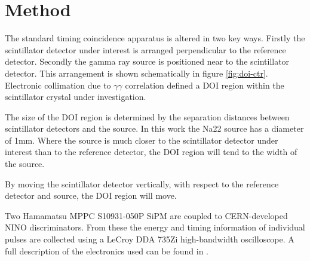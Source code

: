 \section{Method}
The standard timing coincidence apparatus is altered in two key ways. Firstly the scintillator detector under interest is arranged perpendicular to the reference detector. Secondly the gamma ray source is positioned near to the scintillator detector. This arrangement is shown schematically in figure \ref{fig:doi-ctr}. Electronic collimation due to $\gamma\gamma$ correlation defined a DOI region within the scintillator crystal under investigation. 

The size of the DOI region is determined by the separation distances between scintillator detectors and the source. In this work the Na22 source has a diameter of 1mm. Where the source is much closer to the scintillator detector under interest than to the reference detector, the DOI region will tend to the width of the source.

By moving the scintillator detector vertically, with respect to the reference detector and source, the DOI region will move.


Two Hamamatsu MPPC S10931-050P SiPM are coupled to CERN-developed NINO discriminators. From these the energy and timing information of individual pulses are collected using a LeCroy DDA 735Zi high-bandwidth oscilloscope. A full description of the electronics used can be found in \cite{arron_Meyer_Pauwels_Lecoq_2012}.